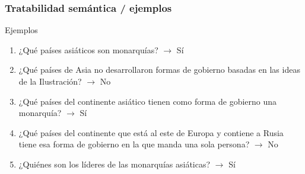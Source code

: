 \begin{frame}[<+->]
  \frametitle{Tratabilidad semántica / ejemplos}

    \begin{block}{Ejemplos}
      \begin{enumerate}
          \item ¿Qué países asiáticos son monarquías? $\rightarrow$ {\color{green}Sí}
          \item ¿Qué países de Asia no desarrollaron formas de gobierno basadas en las ideas de la Ilustración? $\rightarrow$ {\color{red}No}
          \item ¿Qué países del continente asiático tienen como forma de gobierno una monarquía? $\rightarrow$ {\color{green}Sí}
          \item ¿Qué países del continente que está al este de Europa y contiene a Rusia tiene esa forma de gobierno en la que manda una sola persona? $\rightarrow$ {\color{red}No}
          \item ¿Quiénes son los líderes de las monarquías asiáticas? $\rightarrow$ {\color{green}Sí}
      \end{enumerate}
    \end{block}
\end{frame}

